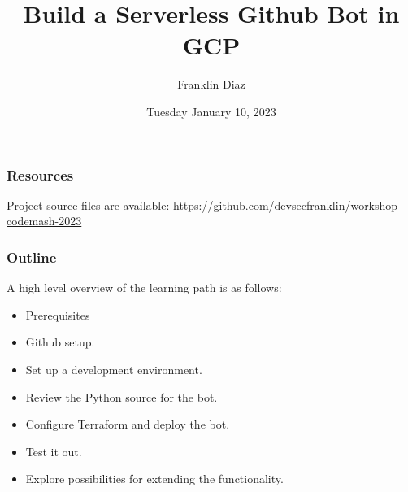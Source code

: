 \documentclass[aspectratio=169]{beamer}
\title{Build a Serverless Github Bot in GCP}
\subtitle{}
\author{Franklin Diaz}
\institute{DE:AD:10:C5}
\date{Tuesday January 10, 2023}
\begin{document}
\frame{\titlepage}




\begin{frame}
    \frametitle{Resources}
    Project source files are available: \url{https://github.com/devsecfranklin/workshop-codemash-2023}
    \vspace{2mm}
\end{frame}

\begin{frame}
    \frametitle{Outline}

    A high level overview of the learning path is as follows:

    \begin{raggedright}
        \begin{itemize}
            \item Prerequisites
            \item Github setup.
            \item Set up a development environment.
            \item Review the Python source for the bot.
            \item Configure Terraform and deploy the bot.
            \item Test it out.
            \item Explore possibilities for extending the functionality.
        \end{itemize}
    \end{raggedright}
    \vspace{2mm}
\end{frame}
\end{document}
